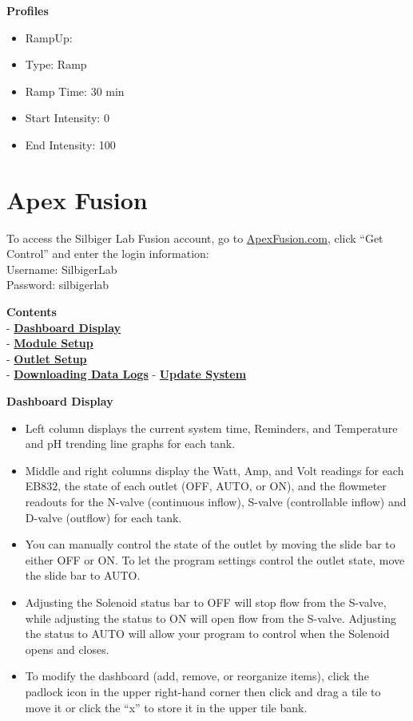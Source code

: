 \documentclass[]{book}
\providecommand{\tightlist}{%
  \setlength{\itemsep}{0pt}\setlength{\parskip}{0pt}}
\begin{document}
 \textbf{Profiles}

\begin{itemize}
\tightlist
\item
  RampUp:
\item
  Type: Ramp
\item
  Ramp Time: 30 min
\item
  Start Intensity: 0
\item
  End Intensity: 100
\end{itemize}

\chapter{Apex Fusion}\label{apex-fusion}

To access the Silbiger Lab Fusion account, go to
\href{https://apexfusion.com}{ApexFusion.com}, click ``Get Control'' and
enter the login information:\\
Username: SilbigerLab\\
Password: silbigerlab

\textbf{Contents}\\
- \protect\hyperlink{Dashboard}{\textbf{Dashboard Display}}\\
- \protect\hyperlink{Module_Setup}{\textbf{Module Setup}}\\
- \protect\hyperlink{Outlet_Setup}{\textbf{Outlet Setup}}\\
- \protect\hyperlink{Data_Logs}{\textbf{Downloading Data Logs}} -
\protect\hyperlink{Update}{\textbf{Update System}}

 \textbf{Dashboard Display}

\begin{itemize}
\tightlist
\item
  Left column displays the current system time, Reminders, and
  Temperature and pH trending line graphs for each tank.
\item
  Middle and right columns display the Watt, Amp, and Volt readings for
  each EB832, the state of each outlet (OFF, AUTO, or ON), and the
  flowmeter readouts for the N-valve (continuous inflow), S-valve
  (controllable inflow) and D-valve (outflow) for each tank.
\item
  You can manually control the state of the outlet by moving the slide
  bar to either OFF or ON. To let the program settings control the
  outlet state, move the slide bar to AUTO.
\item
  Adjusting the Solenoid status bar to OFF will stop flow from the
  S-valve, while adjusting the status to ON will open flow from the
  S-valve. Adjusting the status to AUTO will allow your program to
  control when the Solenoid opens and closes.
\item
  To modify the dashboard (add, remove, or reorganize items), click the
  padlock icon in the upper right-hand corner then click and drag a tile
  to move it or click the ``x'' to store it in the upper tile bank.
\end{itemize}
\end{document}
